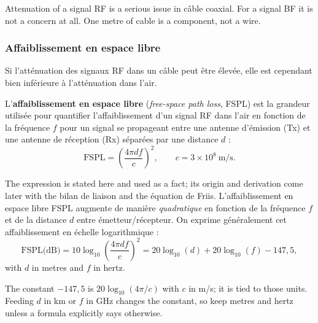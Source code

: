 \begin{conclusion}
  Attenuation of a signal RF is a serious issue in câble coaxial. For a
  signal BF it is not a concern at all. One metre of cable is a
  component, not a wire.
\end{conclusion}

\subsubsection{Affaiblissement en espace libre}
Si l'atténuation des signaux RF dans un câble peut être élevée, elle est
cependant bien inférieure à l'atténuation dans l'air.

\begin{definition}
  L'\textbf{affaiblissement en espace libre} (\textit{free-space path loss},
  FSPL) est la grandeur utilisée pour quantifier l'affaiblissement d'un signal
  RF dans l'air en fonction de la fréquence $f$ pour un signal se propageant
  entre une antenne d'émission (Tx) et une antenne de réception (Rx) séparées
  par une distance $d$ :
  \[\text{FSPL}=\left(\frac{4\pi d f}{c}\right)^{2},\qquad c=3\times 10^{8}\ \text{m/s}.\]
\end{definition}

The expression is stated here and used as a fact; its origin and derivation
come later with the bilan de liaison and the équation de Friis.
L'affaiblissement en espace libre FSPL augmente de manière
\textit{quadratique} en fonction de la fréquence $f$ et de la distance $d$
entre émetteur/récepteur. On exprime généralement cet affaiblissement en
échelle logarithmique :
\[\text{FSPL(dB)}=10\log_{10}\!\left(\frac{4\pi d f}{c}\right)^{2}
  =20\log_{10}(d)+20\log_{10}(f)-147{,}5,\]
with $d$ in metres and $f$ in hertz.

\begin{remark}
  The constant $-147{,}5$ is $20\log_{10}(4\pi/c)$ with $c$ in m/s; it is tied
  to those units. Feeding $d$ in km or $f$ in GHz changes the constant, so keep
  metres and hertz unless a formula explicitly says otherwise.
\end{remark}

